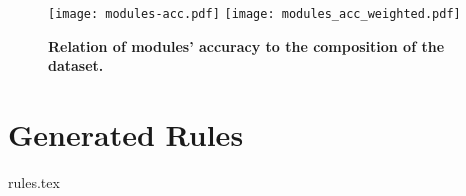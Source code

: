 \documentclass{article}
\begin{document}
\begin{figure}[H]
	\centering
	\texttt{[image: modules-acc.pdf]}\hfil
	\texttt{[image: modules\_acc\_weighted.pdf]}
	\caption{\textbf{Relation of modules' accuracy to the composition of the dataset.}}
	\label{metrics-modules}
\end{figure}

\clearpage
\section{Generated Rules}

{rules.tex}
\end{document}
